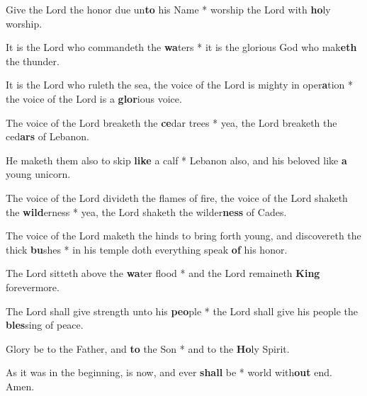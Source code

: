 \begin{multicols}{2}
	Give the Lord the honor due un\textbf{to} his Name * worship the Lord with \textbf{ho}ly worship.
	
	It is the Lord who commandeth the \textbf{wa}ters * it is the glorious God who mak\textbf{eth} the thunder.
	
	It is the Lord who ruleth the sea, the voice of the Lord is mighty in oper\textbf{a}tion * the voice of the Lord is a \textbf{glor}ious voice.
	
	The voice of the Lord breaketh the \textbf{ce}dar trees * yea, the Lord breaketh the ced\textbf{ars} of Lebanon.
	
	He maketh them also to skip \textbf{like} a calf * Lebanon also, and his beloved like \textbf{a} young unicorn.
	
	The voice of the Lord divideth the flames of fire, the voice of the Lord shaketh the \textbf{wild}erness * yea, the Lord shaketh the wilder\textbf{ness} of Cades.
	
	The voice of the Lord maketh the hinds to bring forth young, and discovereth the thick \textbf{bu}shes * in his temple doth everything speak \textbf{of} his honor.
	
	The Lord sitteth above the \textbf{wa}ter flood * and the Lord remaineth \textbf{King} forevermore.
	
	The Lord shall give strength unto his \textbf{peo}ple * the Lord shall give his people the \textbf{bles}sing of peace.
	
	Glory be to the Father, and \textbf{to} the Son * and to the \textbf{Ho}ly Spirit.
	
	As it was in the beginning, is now, and ever \textbf{shall} be * world with\textbf{out} end. Amen.
\end{multicols}